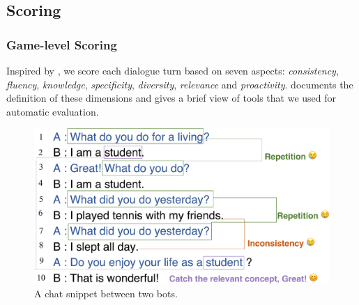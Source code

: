 \subsection{Scoring}
\label{sec:scoring}
\subsubsection{Game-level Scoring}

Inspired by \citet{finch2020towards}, 
we score each dialogue turn based on seven aspects: 
\textit{consistency}, \textit{fluency}, \textit{knowledge}, \textit{specificity}, 
\textit{diversity}, \textit{relevance} and \textit{proactivity}.
 documents the definition of these dimensions
and 
gives a brief view of tools that
we used for automatic evaluation. 


\begin{figure}[th]
        \centering
        \includegraphics[width=0.8\columnwidth]{example_log.eps}
        \caption{A chat snippet between two bots.}
        \label{fig:example}
\end{figure}

